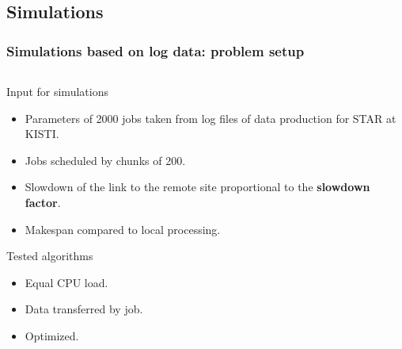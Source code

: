 \documentclass{beamer}
\begin{document}
\subsection{Simulations}
\begin{frame}\frametitle{Simulations based on log data: problem setup}
\begin{columns}[c] %
    \begin{small}
\vspace{-5mm}
 		\begin{block}{Input for simulations}
		\begin{itemize}
			\item Parameters of 2000 jobs taken from log files of data production for STAR at KISTI.
			\item Jobs scheduled by chunks of 200.
			\item Slowdown of the link to the remote site proportional to the \textbf{slowdown factor}.
			\item Makespan compared to local processing.
		\end{itemize}
 	\end{block}
 		\begin{block}{Tested algorithms}
		\begin{itemize}
			\item Equal CPU load.
			\item Data transferred by job. 
			\item Optimized.
		\end{itemize}
 	\end{block}
 	\end{small} 


\end{columns}
\end{frame}
\end{document}
